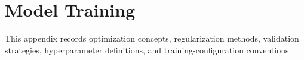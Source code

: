 \section{Model Training}

This appendix records optimization concepts, regularization methods, validation
strategies, hyperparameter definitions, and training-configuration conventions.

